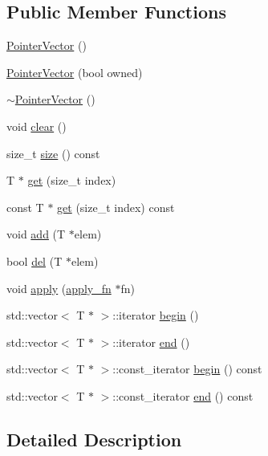 \subsection*{Public Member Functions}
\begin{DoxyCompactItemize}
\item 
\hyperlink{classPointerVector_a44ef76bb36f22d17606d8af8ef12d499}{Pointer\-Vector} ()
\item 
\hyperlink{classPointerVector_ac1c5b843d7862e9db7189d459324e246}{Pointer\-Vector} (bool owned)
\item 
\hyperlink{classPointerVector_a5fd5c0d94cdb693be9a8bb5c2b3e305c}{$\sim$\-Pointer\-Vector} ()
\item 
void \hyperlink{classPointerVector_a9f708acfaa3ce26d14b02d8e285c8729}{clear} ()
\item 
size\-\_\-t \hyperlink{classPointerVector_a65263559ccd6a9eac2904c691453867b}{size} () const 
\item 
T $\ast$ \hyperlink{classPointerVector_af28c2517157ddacfb4d92a4fc73c5a92}{get} (size\-\_\-t index)
\item 
const T $\ast$ \hyperlink{classPointerVector_a298c14996c9995cc56efc2deadd01fe5}{get} (size\-\_\-t index) const 
\item 
void \hyperlink{classPointerVector_abaee9f77dee6ea2523dff64b184c9f54}{add} (T $\ast$elem)
\item 
bool \hyperlink{classPointerVector_acb88f3cb0aa36baaebabc0900bb304e6}{del} (T $\ast$elem)
\item 
void \hyperlink{classPointerVector_a5e9ccf28859f06f13ad3e2dad9ae1cb6}{apply} (\hyperlink{classPointerVector_a578da527d71168684229a721b16e823f}{apply\-\_\-fn} $\ast$fn)
\item 
std\-::vector$<$ T $\ast$ $>$\-::iterator \hyperlink{classPointerVector_a594866129f2e9a3701c1f414ca3299e3}{begin} ()
\item 
std\-::vector$<$ T $\ast$ $>$\-::iterator \hyperlink{classPointerVector_a6182f5429c4c98ba2556d40484aab2f9}{end} ()
\item 
std\-::vector$<$ T $\ast$ $>$\-::const\-\_\-iterator \hyperlink{classPointerVector_a97ee9f133fa9e61341f33feb3f36f45b}{begin} () const 
\item 
std\-::vector$<$ T $\ast$ $>$\-::const\-\_\-iterator \hyperlink{classPointerVector_a62f1573b2bdffb20efaad8fbff6d7676}{end} () const 
\end{DoxyCompactItemize}


\subsection{Detailed Description}
